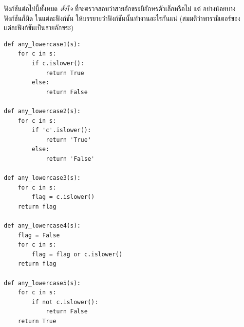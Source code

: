 \begin{exercise}

ฟังก์ชันต่อไปนี้ทั้งหมด {\em ตั้งใจ} ที่จะตรวจสอบว่าสายอักขระมีอักษรตัวเล็กหรือไม่ แต่
อย่างน้อยบางฟังก์ชันก็ผิด ในแต่ละฟังก์ชัน ให้บรรยายว่าฟังก์ชันนั้นทำงานอะไรกันแน่
(สมมติว่าพารามิเตอร์ของแต่ละฟังก์ชันเป็นสายอักขระ)

\begin{verbatim}
def any_lowercase1(s):
    for c in s:
        if c.islower():
            return True
        else:
            return False

def any_lowercase2(s):
    for c in s:
        if 'c'.islower():
            return 'True'
        else:
            return 'False'

def any_lowercase3(s):
    for c in s:
        flag = c.islower()
    return flag

def any_lowercase4(s):
    flag = False
    for c in s:
        flag = flag or c.islower()
    return flag

def any_lowercase5(s):
    for c in s:
        if not c.islower():
            return False
    return True
\end{verbatim}

\end{exercise}


